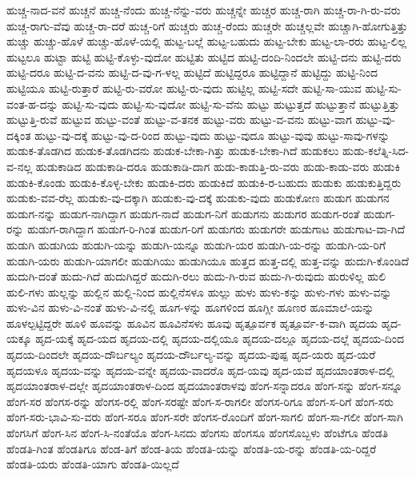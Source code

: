 {ಹುಚ್ಚ-ನಾದ-ವನೆ
ಹುಚ್ಚನೆ
ಹುಚ್ಚ-ನೆಂದು
ಹುಚ್ಚ-ನೆನ್ನು-ವರು
ಹುಚ್ಚನ್ನೇ
ಹುಚ್ಚರ
ಹುಚ್ಚ-ರಾಗಿ
ಹುಚ್ಚ-ರಾ-ಗಿ-ರು-ವರು
ಹುಚ್ಚ-ರಾಗು-ವೆವು
ಹುಚ್ಚ-ರಾ-ದರೆ
ಹುಚ್ಚ-ರಿಗೆ
ಹುಚ್ಚರು
ಹುಚ್ಚ-ರೆಂದು
ಹುಚ್ಚರೇ
ಹುಚ್ಚಲ್ಲವೇ
ಹುಚ್ಚಾಗಿ-ಹೋಗುತ್ತಿತ್ತು
ಹುಚ್ಚು
ಹುಚ್ಚು-ಹೊಳೆ
ಹುಚ್ಚು-ಹೊಳೆ-ಯಲ್ಲಿ
ಹುಟ್ಟ-ಬಲ್ಲೆ
ಹುಟ್ಟ-ಬಹುದು
ಹುಟ್ಟ-ಬೇಕು
ಹುಟ್ಟ-ಲಾ-ರರು
ಹುಟ್ಟ-ಲಿಲ್ಲ
ಹುಟ್ಟಲೂ
ಹುಟ್ಟಾ
ಹುಟ್ಟಿ
ಹುಟ್ಟಿ-ಕೊಳ್ಳು-ವುದೋ
ಹುಟ್ಟಿತು
ಹುಟ್ಟಿದ
ಹುಟ್ಟಿ-ದಂದಿ-ನಿಂದಲೇ
ಹುಟ್ಟಿ-ದನು
ಹುಟ್ಟಿ-ದರು
ಹುಟ್ಟಿ-ದರೂ
ಹುಟ್ಟಿ-ದ-ವನು
ಹುಟ್ಟಿ-ದ-ವು-ಗ-ಳಲ್ಲ
ಹುಟ್ಟಿದೆ
ಹುಟ್ಟಿದ್ದರೂ
ಹುಟ್ಟಿದ್ದಾನೆ
ಹುಟ್ಟಿದ್ದು
ಹುಟ್ಟಿ-ನಿಂದ
ಹುಟ್ಟಿಯೂ
ಹುಟ್ಟಿ-ರುತ್ತಾರೆ
ಹುಟ್ಟಿ-ರು-ವರೋ
ಹುಟ್ಟಿ-ರು-ವುದು
ಹುಟ್ಟಿಲ್ಲ
ಹುಟ್ಟಿ-ಸದೇ
ಹುಟ್ಟಿ-ಸಾ-ಯುವ
ಹುಟ್ಟಿ-ಸು-ವಂತ-ಹ-ದನ್ನು
ಹುಟ್ಟಿ-ಸು-ವುದು
ಹುಟ್ಟಿ-ಸು-ವುದೋ
ಹುಟ್ಟಿ-ಸು-ವೆನು
ಹುಟ್ಟು
ಹುಟ್ಟುತ್ತದೆ
ಹುಟ್ಟುತ್ತಾನೆ
ಹುಟ್ಟುತ್ತಿತ್ತು
ಹುಟ್ಟುತ್ತಿ-ರುವೆ
ಹುಟ್ಟುವ
ಹುಟ್ಟು-ವಂತೆ
ಹುಟ್ಟು-ವ-ತನಕ
ಹುಟ್ಟು-ವರು
ಹುಟ್ಟು-ವ-ವನು
ಹುಟ್ಟು-ವಾಗ
ಹುಟ್ಟು-ವು-ದಕ್ಕಿಂತ
ಹುಟ್ಟು-ವು-ದಕ್ಕೆ
ಹುಟ್ಟು-ವು-ದ-ರಿಂದ
ಹುಟ್ಟು-ವುದು
ಹುಟ್ಟು-ವುದೂ
ಹುಟ್ಟು-ವುವು
ಹುಟ್ಟು-ಸಾವು-ಗಳನ್ನು
ಹುಡುಕ-ತೊಡಗಿದ
ಹುಡುಕ-ತೊಡಗಿದನು
ಹುಡುಕ-ಬೇಕಾ-ಗಿತ್ತು
ಹುಡುಕ-ಬೇಕಾ-ಗಿದೆ
ಹುಡುಕಲು
ಹುಡು-ಕಲೆತ್ನಿ-ಸಿದ-ವ-ನಲ್ಲ
ಹುಡುಕಾಡಿದ
ಹುಡುಕಾಡಿ-ದರೂ
ಹುಡುಕಾಡಿ-ದಾಗ
ಹುಡು-ಕಾಡುತ್ತಿ-ರು-ವರು
ಹುಡು-ಕಾಡು-ವರು
ಹುಡುಕಿ
ಹುಡುಕಿ-ಕೊಂಡು
ಹುಡುಕಿ-ಕೊಳ್ಳ-ಬೇಕು
ಹುಡುಕಿ-ದರು
ಹುಡುಕಿದೆ
ಹುಡುಕಿ-ರ-ಬಹುದು
ಹುಡುಕು
ಹುಡುಕುತ್ತಿದ್ದರು
ಹುಡುಕು-ವವ-ರೆಲ್ಲ
ಹುಡುಕು-ವು-ದಕ್ಕಾಗಿ
ಹುಡುಕು-ವು-ದಕ್ಕೆ
ಹುಡುಕು-ವುದು
ಹುಡುಕೋಣ
ಹುಡುಗ
ಹುಡುಗನ
ಹುಡುಗ-ನನ್ನು
ಹುಡುಗ-ನಾಗಿದ್ದಾಗ
ಹುಡುಗ-ನಾದೆ
ಹುಡುಗ-ನಿಗೆ
ಹುಡುಗನು
ಹುಡುಗರ
ಹುಡುಗ-ರಂತೆ
ಹುಡುಗ-ರನ್ನು
ಹುಡುಗ-ರಾಗಿದ್ದಾಗ
ಹುಡುಗ-ರಿ-ಗಿಂತ
ಹುಡುಗ-ರಿಗೆ
ಹುಡುಗರು
ಹುಡುಗರೇ
ಹುಡುಗಾಟ
ಹುಡುಗಾಟ-ವಾ-ಗಿದೆ
ಹುಡುಗಿ
ಹುಡುಗಿಯ
ಹುಡುಗಿ-ಯನ್ನು
ಹುಡುಗಿ-ಯನ್ನೂ
ಹುಡುಗಿ-ಯರ
ಹುಡುಗಿ-ಯ-ರನ್ನು
ಹುಡುಗಿ-ಯ-ರಿಗೆ
ಹುಡುಗಿ-ಯರು
ಹುಡುಗಿ-ಯಾಗಲೀ
ಹುಡುಗಿಯು
ಹುಡುಗಿಯೂ
ಹುತ್ತದ
ಹುತ್ತ-ದಲ್ಲಿ
ಹುತ್ತ-ವನ್ನು
ಹುದುಗಿ-ಕೊಂಡಿದೆ
ಹುದುಗಿ-ದಂತೆ
ಹುದು-ಗಿದೆ
ಹುದುಗಿದ್ದರೆ
ಹುದುಗಿ-ರಲು
ಹುದು-ಗಿ-ರುವ
ಹುದು-ಗಿ-ರುವುದು
ಹುರುಳಿಲ್ಲ
ಹುಲಿ
ಹುಲಿ-ಗಳು
ಹುಲ್ಲನ್ನು
ಹುಲ್ಲಿನ
ಹುಲ್ಲಿ-ನಿಂದ
ಹುಲ್ಲಿನೆಸಳೂ
ಹುಲ್ಲು
ಹುಳು
ಹುಳು-ಕನ್ನು
ಹುಳು-ಗಳು
ಹುಳು-ವನ್ನು
ಹುಳು-ವಿನ
ಹುಳು-ವಿ-ನಂತೆ
ಹುಳು-ವಿ-ನಲ್ಲಿ
ಹೂಗ-ಳನ್ನು
ಹೂಗಳಿಂದ
ಹೂಗ್ಲೀ
ಹೂಣರ
ಹೂಮಾಲೆ-ಯನ್ನು
ಹೂಳಲ್ಪಟ್ಟಿದ್ದರೇ
ಹೂಳಿ
ಹೂವನ್ನು
ಹೂವಿನ
ಹೂವಿನೆಸಳು
ಹೂವು
ಹೃತ್ಪೂರ್ವಕ
ಹೃತ್ಪೂರ್ವ-ಕ-ವಾಗಿ
ಹೃದಯ
ಹೃದ-ಯಕ್ಕೂ
ಹೃದ-ಯಕ್ಕೆ
ಹೃದ-ಯದ
ಹೃದಯ-ದಲ್ಲಿ
ಹೃದಯ-ದಲ್ಲಿಯೂ
ಹೃದಯ-ದಲ್ಲೂ
ಹೃದಯ-ದಲ್ಲೆ
ಹೃದಯ-ದಿಂದ
ಹೃದಯ-ದಿಂದಲೇ
ಹೃದಯ-ದೌರ್ಬಲ್ಯಂ
ಹೃದಯ-ದೌರ್ಬಲ್ಯ-ವನ್ನು
ಹೃದಯ-ಪುಷ್ಪ
ಹೃದ-ಯರು
ಹೃದ-ಯರೆ
ಹೃದಯಳೂ
ಹೃದಯ-ವನ್ನು
ಹೃದಯ-ವನ್ನೇ
ಹೃದಯ-ವಾದರೊ
ಹೃದ-ಯವು
ಹೃದ-ಯವೆ
ಹೃದಯಾಂತರಾಳ-ದಲ್ಲಿ
ಹೃದಯಾಂತರಾಳ-ದಲ್ಲೇ
ಹೃದಯಾಂತರಾಳ-ದಿಂದ
ಹೃದಯಾಂತರಾಳವು
ಹೆಂಗ-ಸನ್ನಾದರೂ
ಹೆಂಗ-ಸನ್ನು
ಹೆಂಗ-ಸನ್ನೂ
ಹೆಂಗ-ಸರ
ಹೆಂಗಸ-ರನ್ನು
ಹೆಂಗಸ-ರಲ್ಲಿ
ಹೆಂಗ-ಸರಷ್ಟೇ
ಹೆಂಗ-ಸ-ರಾಗಲೀ
ಹೆಂಗಸ-ರಿಗೂ
ಹೆಂಗ-ಸ-ರಿಗೆ
ಹೆಂಗ-ಸರು
ಹೆಂಗ-ಸರು-ಭಾವಿ-ಸು-ವರು
ಹೆಂಗ-ಸರೂ
ಹೆಂಗ-ಸರೇ
ಹೆಂಗಸ-ರೊಂದಿಗೆ
ಹೆಂಗ-ಸಾಗಲಿ
ಹೆಂಗ-ಸಾ-ಗಲೀ
ಹೆಂಗ-ಸಾಗಿ
ಹೆಂಗಸಿಗೆ
ಹೆಂಗ-ಸಿನ
ಹೆಂಗ-ಸಿ-ನಂತೆಯೊ
ಹೆಂಗ-ಸಿನದು
ಹೆಂಗಸು
ಹೆಂಗಸೂ
ಹೆಂಗಸೊಬ್ಬಳು
ಹೆಂಟೆಗೂ
ಹೆಂಡತಿ
ಹೆಂಡತಿ-ಗಿಂತ
ಹೆಂಡತಿಗೂ
ಹೆಂಡ-ತಿಗೆ
ಹೆಂಡ-ತಿಯ
ಹೆಂಡತಿ-ಯನ್ನು
ಹೆಂಡತಿ-ಯ-ರನ್ನು
ಹೆಂಡತಿ-ಯ-ರಿದ್ದರೆ
ಹೆಂಡತಿ-ಯರು
ಹೆಂಡತಿ-ಯಾಗು
ಹೆಂಡತಿ-ಯಿಲ್ಲದೆ
}
